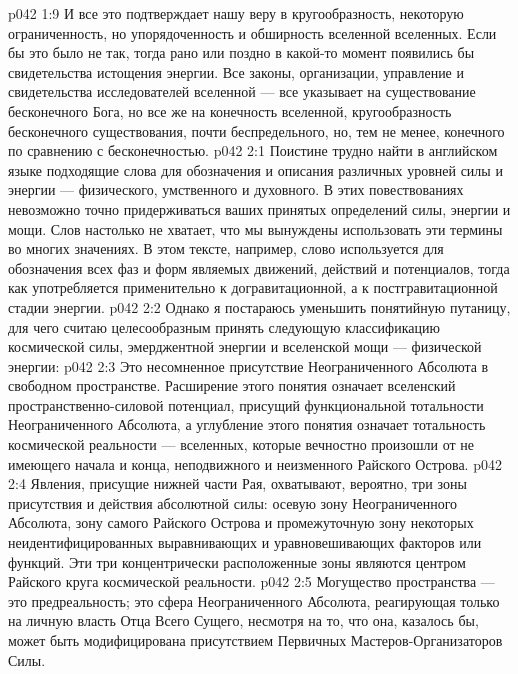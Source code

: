 \vs p042 1:9 \pc И все это подтверждает нашу веру в кругообразность, некоторую ограниченность, но упорядоченность и обширность вселенной вселенных. Если бы это было не так, тогда рано или поздно в какой\hyp{}то момент появились бы свидетельства истощения энергии. Все законы, организации, управление и свидетельства исследователей вселенной --- все указывает на существование бесконечного Бога, но все же на конечность вселенной, кругообразность бесконечного существования, почти беспредельного, но, тем не менее, конечного по сравнению с бесконечностью.
\vs p042 2:1 Поистине трудно найти в английском языке подходящие слова для обозначения и описания различных уровней силы и энергии --- физического, умственного и духовного. В этих повествованиях невозможно точно придерживаться ваших принятых определений силы, энергии и мощи. Слов настолько не хватает, что мы вынуждены использовать эти термины во многих значениях. В этом тексте, например, слово  используется для обозначения всех фаз и форм являемых движений, действий и потенциалов, тогда как  употребляется применительно к догравитационной, а  к постгравитационной стадии энергии.
\vs p042 2:2 Однако я постараюсь уменьшить понятийную путаницу, для чего считаю целесообразным принять следующую классификацию космической силы, эмерджентной энергии и вселенской мощи --- физической энергии:
\vs p042 2:3 \pc {}\bibnobreakspace {}  Это несомненное присутствие Неограниченного Абсолюта в свободном пространстве. Расширение этого понятия означает вселенский пространственно\hyp{}силовой потенциал, присущий функциональной тотальности Неограниченного Абсолюта, а углубление этого понятия означает тотальность космической реальности --- вселенных, которые вечностно произошли от не имеющего начала и конца, неподвижного и неизменного Райского Острова.
\vs p042 2:4 Явления, присущие нижней части Рая, охватывают, вероятно, три зоны присутствия и действия абсолютной силы: осевую зону Неограниченного Абсолюта, зону самого Райского Острова и промежуточную зону некоторых неидентифицированных выравнивающих и уравновешивающих факторов или функций. Эти три концентрически расположенные зоны являются центром Райского круга космической реальности.
\vs p042 2:5 Могущество пространства --- это предреальность; это сфера Неограниченного Абсолюта, реагирующая только на личную власть Отца Всего Сущего, несмотря на то, что она, казалось бы, может быть модифицирована присутствием Первичных Мастеров\hyp{}Организаторов Силы.
